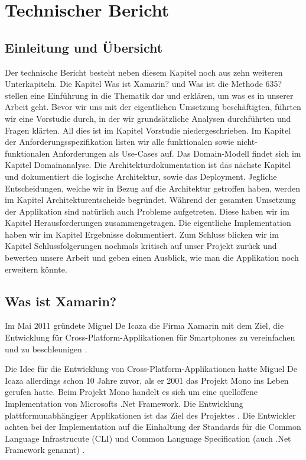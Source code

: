 \section{Technischer Bericht}

\subsection{Einleitung und Übersicht}

Der technische Bericht besteht neben diesem Kapitel noch aus zehn weiteren Unterkapiteln. 
Die Kapitel \grqq Was ist Xamarin?\grqq{} und \grqq Was ist die Methode 635?\grqq{} stellen eine Einführung in die Thematik dar und erklären, um was es in unserer Arbeit geht.
Bevor wir uns mit der eigentlichen Umsetzung beschäftigten, führten wir eine Vorstudie durch, in der wir grundsätzliche Analysen durchführten und Fragen klärten. All dies ist im Kapitel \grqq Vorstudie\grqq{} niedergeschrieben.
Im Kapitel der \grqq Anforderungsspezifikation\grqq{} listen wir alle funktionalen sowie nicht-funktionalen Anforderungen als Use-Cases auf. Das Domain-Modell  findet sich im Kapitel \grqq Domainanalyse\grqq{}.
Die \grqq Architektur\-dokumentation\grqq{} ist das nächste Kapitel und dokumentiert die logische Architektur, sowie das Deployment. Jegliche Entscheidungen, welche wir in Bezug auf die Architektur getroffen haben, werden im Kapitel \grqq Architekturentscheide\grqq{} begründet.
Während der gesamten Umsetzung der Applikation sind natürlich auch Probleme aufgetreten. Diese haben wir im Kapitel \grqq Herausforderungen\grqq{} zusammengetragen.
Die eigentliche Implementation haben wir im Kapitel \grqq Ergebnisse\grqq{} dokumentiert.
Zum Schluss blicken wir im Kapitel \grqq Schlussfolgerungen\grqq{} nochmals kritisch auf unser Projekt zurück und bewerten unsere Arbeit und geben einen Ausblick, wie man die Applikation noch erweitern könnte.

\subsection{Was ist Xamarin?}
Im Mai 2011 gründete Miguel De Icaza die Firma Xamarin mit dem Ziel, die Entwicklung für Cross-Platform-Applikationen für Smartphones zu vereinfachen und zu beschleunigen \cite{XamarinWikipedia}.

Die Idee für die Entwicklung von Cross-Platform-Applikationen hatte Miguel De Icaza allerdings schon 10 Jahre zuvor, als er 2001 das Projekt Mono ins Leben gerufen hatte. Beim Projekt Mono handelt es sich um eine quelloffene Implementation von Microsofts .Net Framework. Die Entwicklung plattformunabhängiger Applikationen ist das Ziel des Projektes \cite{XamarinCCVossel}. Die Entwickler achten bei der Implementation auf die Einhaltung der Standards für die Common Language Infrastrucute (CLI) und Common Language Specification (auch .Net Framework genannt) \cite{XamarinQuora}.

